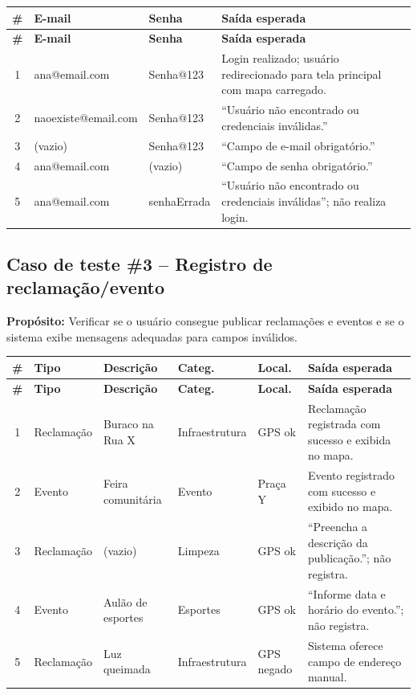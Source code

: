 \begin{longtable}{|c|p{4cm}|p{2.5cm}|p{5.5cm}|}
  \hline
  \textbf{\#} & \textbf{E-mail} & \textbf{Senha} & \textbf{Saída esperada} \\
  \hline
  \endfirsthead
  \hline
  \textbf{\#} & \textbf{E-mail} & \textbf{Senha} & \textbf{Saída esperada} \\
  \hline
  \endhead
  1 & ana@email.com & Senha@123 & Login realizado; usuário redirecionado para tela principal com mapa carregado. \\
  \hline
  2 & naoexiste@email.com & Senha@123 & ``Usuário não encontrado ou credenciais inválidas.'' \\
  \hline
  3 & (vazio) & Senha@123 & ``Campo de e-mail obrigatório.'' \\
  \hline
  4 & ana@email.com & (vazio) & ``Campo de senha obrigatório.'' \\
  \hline
  5 & ana@email.com & senhaErrada & ``Usuário não encontrado ou credenciais inválidas''; não realiza login. \\
  \hline
\end{longtable}

\subsection*{Caso de teste \#3 – Registro de reclamação/evento}

\textbf{Propósito:} Verificar se o usuário consegue publicar reclamações e
eventos e se o sistema exibe mensagens adequadas para campos inválidos.

\begin{longtable}{|c|p{2cm}|p{3cm}|p{2cm}|p{2cm}|p{3.5cm}|}
  \hline
  \textbf{\#} & \textbf{Tipo} & \textbf{Descrição} & \textbf{Categ.} & \textbf{Local.} & \textbf{Saída esperada} \\
  \hline
  \endfirsthead
  \hline
  \textbf{\#} & \textbf{Tipo} & \textbf{Descrição} & \textbf{Categ.} & \textbf{Local.} & \textbf{Saída esperada} \\
  \hline
  \endhead
  1 & Reclamação & Buraco na Rua X & Infraestrutura & GPS ok & Reclamação registrada com sucesso e exibida no mapa. \\
  \hline
  2 & Evento & Feira comunitária & Evento & Praça Y & Evento registrado com sucesso e exibido no mapa. \\
  \hline
  3 & Reclamação & (vazio) & Limpeza & GPS ok & ``Preencha a descrição da publicação.''; não registra. \\
  \hline
  4 & Evento & Aulão de esportes & Esportes & GPS ok & ``Informe data e horário do evento.''; não registra. \\
  \hline
  5 & Reclamação & Luz queimada & Infraestrutura & GPS negado & Sistema oferece campo de endereço manual. \\
  \hline
\end{longtable}

